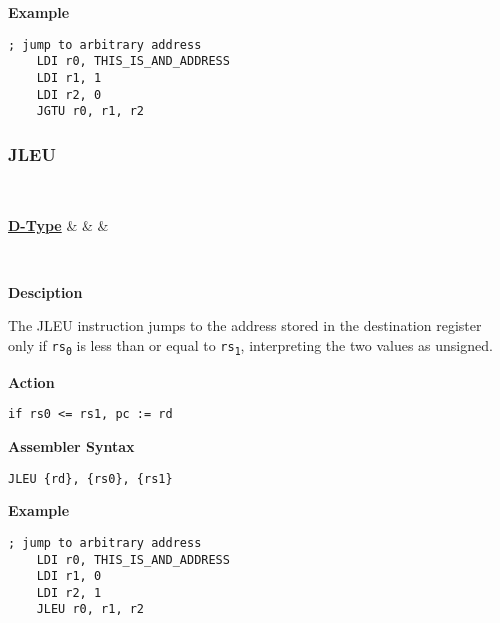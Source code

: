 \vspace{3ex}

\textbf{Example}
\begin{lstlisting}[frame=single]
	; jump to arbitrary address
	LDI r0, THIS_IS_AND_ADDRESS
	LDI r1, 1
	LDI r2, 0
	JGTU r0, r1, r2
\end{lstlisting}

\subsubsection{JLEU }\label{sec:JLEU}

\vspace{3ex}

\begin{center}
	\begin{bytefield}[leftcurly=., leftcurlyspace=0pt]{32}
		 \\
		\begin{leftwordgroup}{\hyperref[sec:r-type]{\textbf{D-Type}}}
		 & 
		 &
		 &
		\end{leftwordgroup}\\
	\end{bytefield}
\end{center}

\textbf{Desciption}

The JLEU instruction jumps to the address stored in the destination register only if \texttt{rs\textsubscript{0}} is less than or equal to \texttt{rs\textsubscript{1}},
interpreting the two values as unsigned.

\vspace{3ex}

\textbf{Action}
\begin{lstlisting}[frame=single]
	if rs0 <= rs1, pc := rd
\end{lstlisting}

\vspace{3ex}

\textbf{Assembler Syntax}
\begin{lstlisting}[frame=single]
	JLEU {rd}, {rs0}, {rs1}
\end{lstlisting}

\vspace{3ex}

\textbf{Example}
\begin{lstlisting}[frame=single]
	; jump to arbitrary address
	LDI r0, THIS_IS_AND_ADDRESS
	LDI r1, 0
	LDI r2, 1
	JLEU r0, r1, r2
\end{lstlisting}
